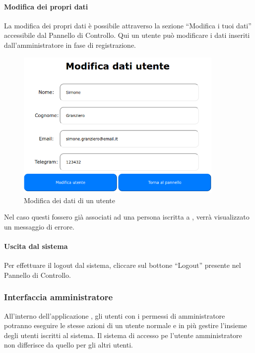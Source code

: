 \paragraph{Modifica dei propri dati}
La modifica dei propri dati è possibile attraverso la sezione ``Modifica i tuoi dati'' accessibile dal Pannello di Controllo.
Qui un utente può modificare i dati inseriti dall'amministratore in fase di registrazione.
\begin{figure}[H]
	\centering
	\includegraphics[width=10cm]{img/modifica_1.png}
	\caption{Modifica dei dati di un utente}
\end{figure}
Nel caso questi fossero già associati ad una persona iscritta a \progetto, verrà visualizzato un messaggio di errore.

\paragraph{Uscita dal sistema}
Per effettuare il logout dal sistema, cliccare sul bottone ``Logout'' presente nel Pannello di Controllo.

\subsubsection{Interfaccia amministratore}
All'interno dell'applicazione \progetto, gli utenti con i permessi di amministratore potranno eseguire le stesse azioni di un utente normale e in più gestire l'insieme degli utenti iscritti al sistema. Il sistema di accesso pe l'utente amministratore non differisce da quello per gli altri utenti.

